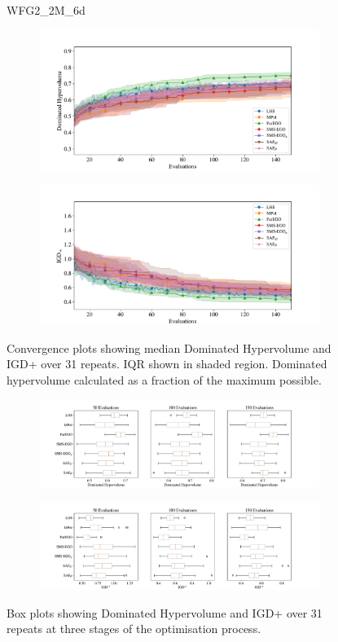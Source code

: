 \documentclass[conference]{IEEEtran}
\begin{document}
\begin{figure}
WFG2\_2M\_6d


\begin{subfigure}[hbt!]{\linewidth}

    \centering
    \includegraphics[width=0.7\linewidth]{figures/wfg2_2obj_6dim_hv_plot.pdf}
\end{subfigure}
\begin{subfigure}[h]{\linewidth}
    \centering
    \includegraphics[width=0.7\linewidth]{figures/wfg2_2obj_6dim_igd_plot.pdf}
\end{subfigure}
    \caption{Convergence plots showing median Dominated Hypervolume and IGD+ over 31 repeats. IQR shown in shaded region. Dominated hypervolume calculated as a fraction of the maximum possible.}
\vspace{\floatsep}
\begin{subfigure}[t]{\linewidth}
    \centering
    \includegraphics[width=0.8\linewidth]{figures/wfg2_2obj_6dim_hv_boxplot.pdf}
\end{subfigure}
\begin{subfigure}[t]{\linewidth}
    \centering
    \includegraphics[width=0.8\linewidth]{figures/wfg2_2obj_6dim_igd_boxplot.pdf}
\end{subfigure}
    \caption{Box plots showing Dominated Hypervolume and IGD+ over 31 repeats at three stages of the optimisation process.}
\end{figure}
\clearpage
\end{document}
